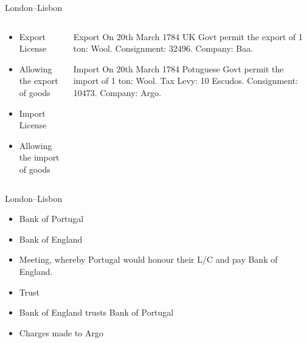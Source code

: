 \documentclass[pdf,table]{beamer}
\begin{document}
\begin{frame}{London\---Lisbon}
	\begin{columns}[T]
		\begin{column}{0.48\textwidth}
			\begin{itemize}
				\item Export License
				\item Allowing the export of goods
				\item Import License 
				\item Allowing the import of goods
			\end{itemize}
		\end{column}
		\begin{column}{0.48\textwidth}
			\begin{block}{Export}
				On 20th March 1784 UK Govt permit the export of 1 ton: Wool. Consignment: 32496. Company: Baa.
			\end{block}
			\begin{block}{Import}
				On 20th March 1784 Potuguese Govt permit the import of 1 ton: Wool. Tax Levy: 10 Escudos. Consignment: 10473. Company: Argo. 
			\end{block}
		\end{column}
	\end{columns}	
\end{frame}

\begin{frame}{London\---Lisbon}
	\begin{itemize}
		\item Bank of Portugal
		\item Bank of England
		\item Meeting, whereby Portugal would honour their L/C and pay Bank of England.
		\item Trust
		\item Bank of England trusts Bank of Portugal
		\item Charges made to Argo
	\end{itemize}
\end{frame}
\end{document}
